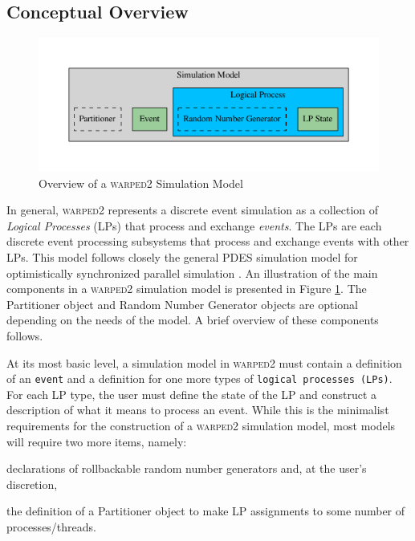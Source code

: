 \documentclass[11pt]{book}
\begin{document}
\subsection{Conceptual Overview}


\begin{figure}
    \centering
    \includegraphics[width=\textwidth,quiet]{figs/graphviz/model.pdf}
    \caption{Overview of a \textsc{warped2} Simulation Model}\label{warped2_conceptual_overview}
\end{figure}

In general, \textsc{warped2} represents a discrete event simulation as a collection of \emph{Logical
  Processes} (LPs) that process and exchange \emph{events}.  The LPs are each discrete event
processing subsystems that process and exchange events with other LPs.  This model follows closely
the general PDES simulation model for optimistically synchronized parallel simulation
\cite{fujimoto-90,jefferson-85}.  An illustration of the main components in a \textsc{warped2}
simulation model is presented in Figure \ref{warped2_conceptual_overview}.  The Partitioner object
and Random Number Generator objects are optional depending on the needs of the model.  A brief
overview of these components follows.

At its most basic level, a simulation model in \textsc{warped2} must contain a definition of an
\texttt{event} and a definition for one more types of \texttt{logical processes (LPs)}.  For
each LP type, the user must define the state of the LP and construct a description of what it
means to process an event.  While this is the minimalist requirements for the construction of
a \textsc{warped2} simulation model, most models will require two more items, namely:
\begin{inparaenum}[(1)] \item declarations of rollbackable random number generators and,
at the user's discretion, \item the definition of a Partitioner object to make LP assignments
to some number of processes/threads.\end{inparaenum}
\end{document}
